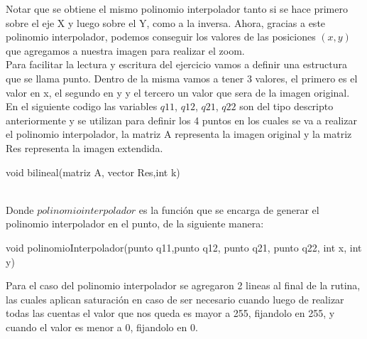 Notar que se obtiene el mismo polinomio interpolador tanto si se hace primero sobre el eje X y luego sobre el Y, como a la inversa. Ahora, gracias a este polinomio interpolador, podemos conseguir los valores de las posiciones $(x,y)$ que agregamos a nuestra imagen para realizar el zoom.\\
Para facilitar la lectura y escritura del ejercicio vamos a definir una estructura que se llama punto. Dentro de la misma vamos a tener 3 valores, el primero es el valor en x, el segundo en y y el tercero un valor que sera de la imagen original. 
En el siguiente codigo las variables $q11$, $q12$, $q21$, $q22$ son del tipo descripto anteriormente y se utilizan para definir los 4 puntos en los cuales se va a realizar el polinomio interpolador, la matriz A representa la imagen original y la matriz Res representa la imagen extendida.
\begin{algorithm}
\begin{algorithmic}[1]\parskip=1mm
\caption{void bilineal(matriz A, vector Res,int k)}
\end{algorithmic}
\end{algorithm}\\
Donde $polinomio interpolador$ es la función que se encarga de generar el polinomio interpolador en el punto, de la siguiente manera:
\newpage
\begin{algorithm}
\begin{algorithmic}[1]\parskip=1mm
\caption{void polinomioInterpolador(punto q11,punto q12, punto q21, punto q22, int x, int y)}
\end{algorithmic}
\end{algorithm}
Para el caso del polinomio interpolador se agregaron 2 lineas al final de la rutina, las cuales aplican saturación en caso de ser necesario cuando luego de realizar todas las cuentas el valor que nos queda es mayor a 255, fijandolo en 255, y cuando el valor es menor a 0, fijandolo en 0.

